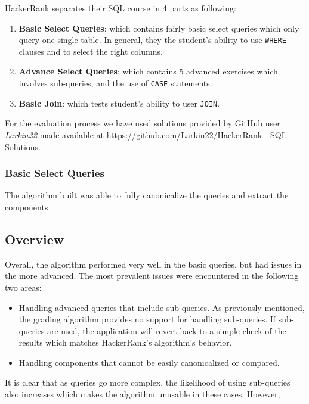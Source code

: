 HackerRank separates their SQL course in 4 parts as following:
\begin{enumerate}
    \item \textbf{Basic Select Queries}: which contains fairly basic select queries which only query one single table. In general, they the student's ability to use \texttt{WHERE} clauses and to select the right columns.
    \item \textbf{Advance Select Queries}: which contains 5 advanced exercises which involves sub-queries, and the use of \texttt{CASE} statements.
    \item \textbf{Basic Join}: which tests student's ability to user \texttt{JOIN}.
\end{enumerate}

For the evaluation process we have used solutions provided by GitHub user \textit{Larkin22} made available at \url{https://github.com/Larkin22/HackerRank---SQL-Solutions}.

\subsubsection{Basic Select Queries}

The algorithm built was able to fully canonicalize the queries and extract the components

\subsection{Overview}

Overall, the algorithm performed very well in the basic queries, but had issues in the more advanced. The most prevalent issues were encountered in the following two areas:
\begin{itemize}
    \item Handling advanced queries that include sub-queries. As previously mentioned, the grading algorithm provides no support for handling sub-queries. If sub-queries are used, the application will revert back to a simple check of the results which matches HackerRank's algorithm's behavior.
    \item Handling components that cannot be easily canonicalized or compared.
\end{itemize}

It is clear that as queries go more complex, the likelihood of using sub-queries also increases which makes the algorithm unusable in these cases. However,
